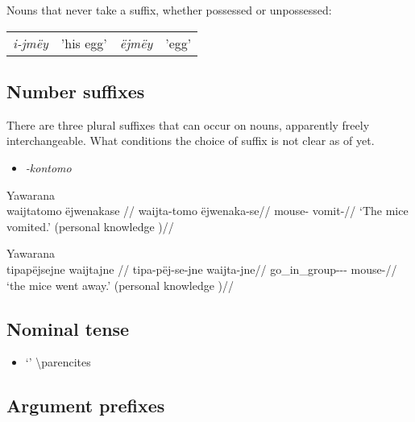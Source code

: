 \documentclass{memoir}
\begin{document}
\ex\label{unsuffixednouns} Nouns that never take a suffix, whether
possessed or unpossessed:

\begin{tabular}[t]{llll}

\emph{i-jmëy} & 'his egg’ & \emph{ëjmëy} & 'egg’ \\

\end{tabular}
 \xe

\subsection{\texorpdfstring{Number suffixes
\label{sec:nominalnumber}}{Number suffixes }}

There are three plural suffixes that can occur on nouns, apparently
freely interchangeable. What conditions the choice of suffix is not
clear as of yet.

\begin{itemize}
\tightlist
\item
  \emph{-kontomo}
\end{itemize}

\ex  Yawarana  \\\label{ctorat-17}
\begingl \glpreamble waijtatomo ëjwenakase //
\gla waijta-tomo ëjwenaka-se//
\glb mouse- vomit-//
\glft ‘The mice vomited.’ (personal knowledge
)//
\endgl
\xe

\ex  Yawarana  \\\label{ctorat-40}
\begingl \glpreamble tipapëjsejne waijtajne //
\gla tipa-pëj-se-jne waijta-jne//
\glb go\_in\_group--- mouse-//
\glft ‘the mice went away.’ (personal knowledge
)//
\endgl
\xe

\subsection{\texorpdfstring{Nominal tense
\label{sec:nominaltense}}{Nominal tense }}

\begin{itemize}
\tightlist
\item
   `' \textbackslash parencites
\end{itemize}

\subsection{\texorpdfstring{Argument prefixes
\label{sec:nominalperson}}{Argument prefixes }}
\end{document}
